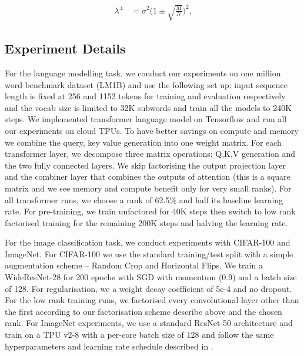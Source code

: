 \documentclass{article}
\begin{document}
\begin{align}
\lambda^\pm &= \sigma^2 \bigg( 1 \pm \sqrt{\frac{M}{N}}\bigg)^2\text{,}
\end{align}












\subsection{Experiment Details}
\label{appendix:exp_details}
For the language modelling task, we conduct our experiments on one million word benchmark dataset (LM1B) \cite{lm1b} and use the following set up: input sequence length is fixed at 256 and 1152 tokens for training and evaluation respectively and the vocab size is limited to 32K subwords and train all the models to 240K steps. We implemented transformer language model on Tensorflow and run all our experiments on cloud TPUs. To have better savings on compute and memory we combine the query, key value generation into one weight matrix. For each transformer layer, we decompose three matrix operations; Q,K,V generation and the two fully connected layers. We skip factorising the output projection layer and the combiner layer that combines the outputs of attention (this is a square matrix and we see memory and compute benefit only for very small ranks). For all transformer runs, we choose a rank of 62.5\% and half its baseline learning rate. For pre-training, we train unfactored for 40K steps then switch to low rank factorised training for the remaining 200K steps and halving the learning rate.

For the image classification task, we conduct experiments with CIFAR-100 and ImageNet. For CIFAR-100 we use the standard training/test split with a simple augmentation scheme -- Random Crop and Horizontal Flips. We train a WideResNet-28 \cite{wideresnet} for 200 epochs with SGD with momentum (0.9) and a batch size of 128. For regularisation, we a weight decay coefficient of 5e-4 and no dropout. For the low rank training runs, we factorised every convolutional layer other than the first according to our factorisation scheme describe above and the chosen rank. For ImageNet experiments, we use a standard ResNet-50 architecture and train on a TPU v2-8 with a per-core batch size of 128 and follow the same hyperparameters and learning rate schedule described in \cite{resnet}.
\end{document}
